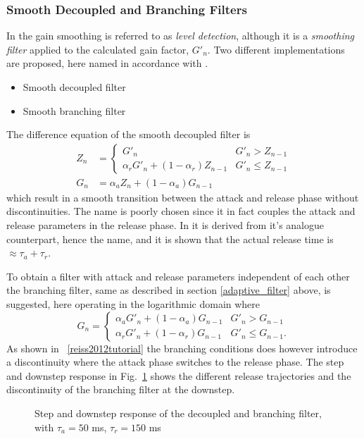 \documentclass[../main2.tex]{subfiles}
\providecommand{\rootdir}{..}
\begin{document}
\subsubsection{Smooth Decoupled and Branching Filters}
In \cite{reiss2012tutorial} the gain smoothing is referred to as \emph{level detection}, although it is a \emph{smoothing filter} applied to the calculated gain factor, $G'_n$. Two different implementations are proposed, here named in accordance with \cite{reiss2012tutorial}.
\begin{itemize}
\item{Smooth decoupled filter}
\item{Smooth branching filter}
\end{itemize}
The difference equation of the smooth decoupled filter is
\begin{equation}
\begin{split}
Z_n &= \begin{cases}
   G'_n								& G'_n > Z_{n-1} \\
    \alpha_{r} G'_n + (1-\alpha_{r}) Z_{n-1} 	& G'_n \leq Z_{n-1}
\end{cases} \\
G_n &= \alpha_{a} Z_n + (1-\alpha_{a}) G_{n-1}
\end{split}
\end{equation}
which result in a smooth transition between the attack and release phase without discontinuities. The name is poorly chosen since it in fact couples the attack and release parameters in the release phase. In \cite{reiss2012tutorial} it is derived from it's analogue counterpart, hence the name, and it is shown that the actual release time is $\approx \tau_a + \tau_r$.

To obtain a filter with attack and release parameters independent of each other the branching filter, same as described in section \ref{adaptive_filter} above, is suggested, here operating in the logarithmic domain where 
\begin{equation}
G_n = \begin{cases}
    \alpha_{a} G'_n + (1-\alpha_{a}) G_{n-1} 	& G'_n > G_{n-1} \\
    \alpha_{r} G'_n + (1-\alpha_{r}) G_{n-1} 	& G'_n \leq G_{n-1}.
\end{cases}
\end{equation}
As shown in ~\ref{reiss2012tutorial} the branching conditions does however introduce a discontinuity where the attack phase switches to the release phase. The step and downstep response in Fig.~\ref{fig:step_reiss_filter} shows the different release trajectories and the discontinuity of the branching filter at the downstep.
\begin{figure}
\centerline{}
\caption{Step and downstep response of the decoupled and branching filter, with $\tau_a = 50$ ms, $\tau_r = 150$ ms}
\label{fig:step_reiss_filter}
\end{figure}
\end{document}
